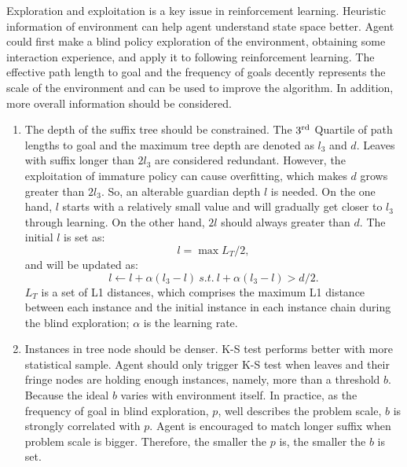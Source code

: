 \documentclass[conference]{IEEEtran}
\begin{document}
	Exploration and exploitation is a key issue in reinforcement learning. Heuristic information
	of environment can help agent understand state space better. Agent could first make a blind
	policy exploration of the environment, obtaining some interaction experience, and apply
	it to following reinforcement learning. The effective path length to goal and the frequency
	of goals decently represents the scale of the environment and can be used to improve the algorithm.
	In addition, more overall information should be considered.
	
	\begin{enumerate}
		\item The depth of the suffix tree should be constrained. The $3^\textnormal{rd}$ Quartile of
		path lengths to goal and the maximum tree depth are denoted as $l_3$ and $d$. Leaves with suffix longer
		than $2l_3$ are considered redundant. However, the exploitation of immature policy can cause overfitting,
		which makes $d$ grows greater than $2l_3$. So, an alterable guardian depth $l$ is needed.
		On the one hand, $l$ starts with a relatively small value and will gradually get closer
		to $l_3$ through learning. On the other hand, $2l$ should always greater than $d$.
		The initial $l$ is set as:
		\begin{equation}
		l = \max{L_T}/2,
		\end{equation}
		and will be updated as:
		\begin{equation}
		l \leftarrow l + \alpha (l_3 - l)  \ s.t. \ l + \alpha (l_3 - l)> d/2. \label{equ:l3}
		\end{equation}
		$L_T$ is a set of L1 distances, which comprises the maximum L1 distance between each
		instance and the initial instance in each instance chain during the blind exploration;
		$\alpha$ is the learning rate.
		
		\item Instances in tree node should be denser. K-S test performs better with more statistical
		sample. Agent should only trigger K-S test when leaves and their fringe nodes are holding enough
		instances, namely, more than a threshold $b$. Because the ideal $b$ varies with environment itself.
		In practice, as the frequency of goal in blind exploration, $p$, well describes the problem scale,
		$b$ is strongly correlated with $p$. Agent is encouraged to match longer suffix when
		problem scale is bigger. Therefore, the smaller the $p$ is, the smaller the $b$ is set.
		

\end{enumerate}
\end{document}
